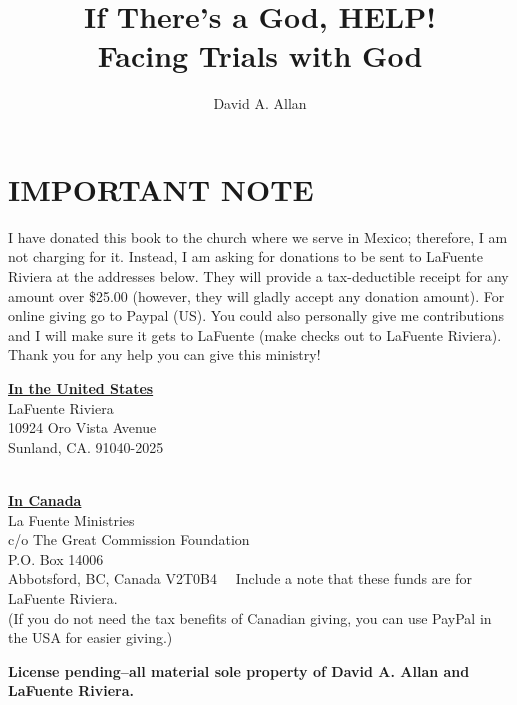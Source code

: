 \documentclass[oneside]{book}
\begin{document}
%

\frontmatter
\title{If There's a God, HELP!\\
	\large Facing Trials with God
}
\author{David A. Allan}
\maketitle
\chapter{IMPORTANT NOTE}
I have donated this book to the church where we serve in Mexico; therefore, I am not charging for it. Instead, I am asking for donations to be sent to LaFuente Riviera at the addresses below. They will provide a tax-deductible receipt for any amount over \$25.00 (however, they will gladly accept any donation amount). For online giving go to Paypal (US). You could also personally give me contributions and I will make sure it gets to LaFuente (make checks out to LaFuente Riviera). Thank you for any help you can give this ministry!\\

\begin{center}
\underline{\textbf{In the United States}}\\
LaFuente Riviera\\
10924 Oro Vista Avenue\\
Sunland, CA. 91040-2025\\
\
\

\underline{\textbf{In Canada}}\\
La Fuente Ministries\\
c/o The Great Commission Foundation\\
P.O. Box 14006\\
Abbotsford, BC, Canada V2T0B4
\
\
Include a note that these funds are for LaFuente Riviera.\\
(If you do not need the tax benefits of Canadian giving, you can use PayPal in the USA for easier giving.)
\end{center}
\textbf{License pending--all material sole property of David A. Allan and LaFuente Riviera.}
\end{document}
